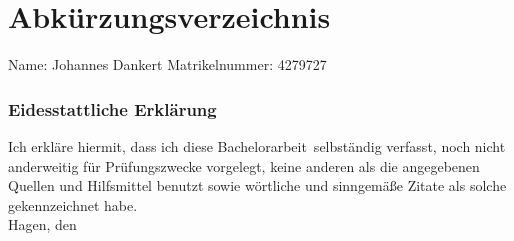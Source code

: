 \documentclass[twoside,bibliography=totoc,openany]{fumi}
\newcommand{\thesisauthor}{Johannes Dankert}
\newcommand{\thesistype}{Bachelorarbeit}
\newcommand{\thesismatrikelnummer}{4279727}
\begin{document}
\pagestyle{headings}
\tableofcontents









\appendix


\backmatter
\pagestyle{fancyclear}

{\footnotesize
\flushleft
\setlength{\itemsep}{-3pt}

}
\cleardoublepage

\listoffigures
\cleardoublepage

\listoftables
\cleardoublepage

\renewcommand\lstlistlistingname{Verzeichnis der Auflistungen}
\lstlistoflistings
\cleardoublepage

\renewcommand*\listalgorithmcfname{Verzeichnis der Algorithmen}
\listofalgorithms
\cleardoublepage

\chapter*{Abkürzungsverzeichnis}

\cleardoublepage

Name: \thesisauthor \hfill
Matrikelnummer: \thesismatrikelnummer
\vspace{2cm}

\subsection*{Eidesstattliche Erklärung}
Ich erkläre hiermit, dass ich diese \thesistype~selbständig verfasst,
noch nicht anderweitig für Prüfungszwecke vorgelegt, keine anderen als
die angegebenen Quellen und Hilfsmittel benutzt sowie wörtliche und
sinngemäße Zitate als solche gekennzeichnet habe.\\[1cm]

Hagen, den \dotfill

\hspace{2cm}{\footnotesize Datum}
\hspace{5cm}{\footnotesize \thesisauthor}
\end{document}
